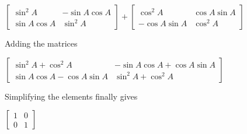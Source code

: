\documentclass[journal,12pt,twocolumn]{IEEEtran}
\begin{document}
\begin{center}
\flushleft $\left [\begin{array}{cc}\sin^2 A &  -\sin A\cos A \\
\sin A\cos A & \sin^2 A\end{array}\right ] +$\flushright $\left [\begin{array}{cc}\cos^2 A & \cos A\sin A \\
 -\cos A\sin A & \cos^2 A\end{array}\right ]$\newline
\end{center}\par

Adding the matrices

\begin{center}
$\left [\begin{array}{cc}\sin^2 A + \cos^2 A &  -\sin A \cos A +\cos A \sin A \\
 \sin A \cos A -\cos A \sin A & \sin^2 A + \cos^2 A\end{array}\right ]$\linebreak
\end{center}\par

Simplifying the elements finally gives

\begin{center}
$\left [\begin{array}{cc}1 & 0 \\
0 & 1\end{array}\right ]$
\end{center}\par
\end{document}
